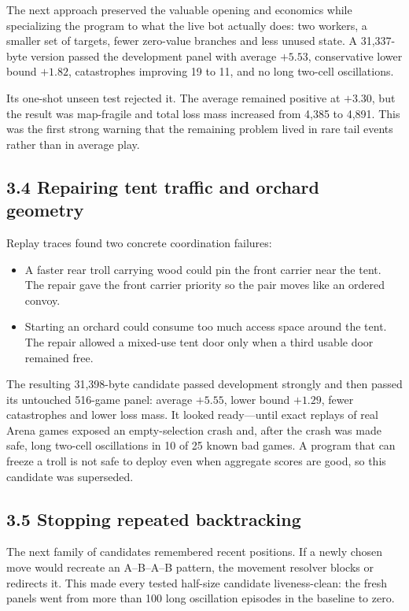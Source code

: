 \documentclass[10pt,a4paper]{article}
\begin{document}
The next approach preserved the valuable opening and economics while specializing the program
to what the live bot actually does: two workers, a smaller set of targets, fewer zero-value
branches and less unused state. A 31,337-byte version passed the development panel with average
$+5.53$, conservative lower bound $+1.82$, catastrophes improving 19 to 11, and no long
two-cell oscillations.

Its one-shot unseen test rejected it. The average remained positive at $+3.30$, but the result
was map-fragile and total loss mass increased from 4,385 to 4,891. This was the first strong
warning that the remaining problem lived in rare tail events rather than in average play.

\subsection*{3.4 Repairing tent traffic and orchard geometry}

Replay traces found two concrete coordination failures:
\begin{itemize}
\item A faster rear troll carrying wood could pin the front carrier near the tent. The repair
gave the front carrier priority so the pair moves like an ordered convoy.
\item Starting an orchard could consume too much access space around the tent. The repair allowed
a mixed-use tent door only when a third usable door remained free.
\end{itemize}

The resulting 31,398-byte candidate passed development strongly and then passed its untouched
516-game panel: average $+5.55$, lower bound $+1.29$, fewer catastrophes and lower loss mass.
It looked ready---until exact replays of real Arena games exposed an empty-selection crash and,
after the crash was made safe, long two-cell oscillations in 10 of 25 known bad games. A program
that can freeze a troll is not safe to deploy even when aggregate scores are good, so this
candidate was superseded.

\subsection*{3.5 Stopping repeated backtracking}

The next family of candidates remembered recent positions. If a newly chosen move would recreate
an A--B--A--B pattern, the movement resolver blocks or redirects it. This made every tested
half-size candidate liveness-clean: the fresh panels went from more than 100 long oscillation
episodes in the baseline to zero.
\end{document}
